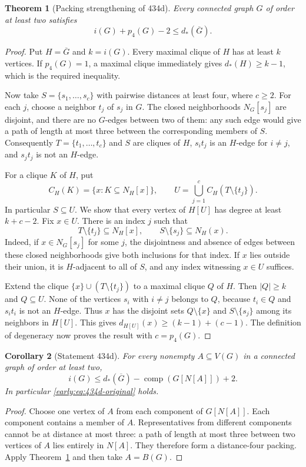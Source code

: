 \documentclass[11pt,a4paper]{article}
\newtheorem{theorem}{Theorem}[section]
\newtheorem{corollary}[theorem]{Corollary}
\theoremstyle{definition}\newtheorem{definition}[theorem]{Definition}
\theoremstyle{remark}\newtheorem{remark}[theorem]{Remark}
\begin{document}
\begin{theorem}[Packing strengthening of 434d]
\label{early:thm:434d-packing}
Every connected graph $G$ of order at least two satisfies
\[
 i(G)+p_4(G)-2\leq d_*(\overline G).
\]
\end{theorem}
\begin{proof}
Put $H=\overline G$ and $k=i(G)$.  Every maximal clique of $H$ has at
least $k$ vertices.  If $p_4(G)=1$, a maximal clique immediately gives
$d_*(H)\geq k-1$, which is the required inequality.

Now take $S=\{s_1,\ldots,s_c\}$ with pairwise distances at least four,
where $c\geq2$.  For each $j$, choose a neighbor $t_j$ of $s_j$ in $G$.
The closed neighborhoods $N_G[s_j]$ are disjoint, and there are no
$G$-edges between two of them: any such edge would give a path of length
at most three between the corresponding members of $S$.  Consequently
$T=\{t_1,\ldots,t_c\}$ and $S$ are cliques of $H$, $s_it_j$ is an
$H$-edge for $i\ne j$, and $s_jt_j$ is not an $H$-edge.

For a clique $K$ of $H$, put
\[
 C_H(K)=\{x:K\subseteq N_H[x]\},\qquad
 U=\bigcup_{j=1}^c C_H(T\setminus\{t_j\}).
\]
In particular $S\subseteq U$.  We show that every vertex of $H[U]$ has
degree at least $k+c-2$.  Fix $x\in U$.  There is an index $j$ such that
\[
 T\setminus\{t_j\}\subseteq N_H[x],\qquad
 S\setminus\{s_j\}\subseteq N_H(x).
\]
Indeed, if $x\in N_G[s_j]$ for some $j$, the disjointness and absence of
edges between these closed neighborhoods give both inclusions for that
index.  If $x$ lies outside their union, it is $H$-adjacent to all of $S$,
and any index witnessing $x\in U$ suffices.

Extend the clique $\{x\}\cup(T\setminus\{t_j\})$ to a maximal clique
$Q$ of $H$.  Then $|Q|\geq k$ and $Q\subseteq U$.  None of the vertices
$s_i$ with $i\ne j$ belongs to $Q$, because $t_i\in Q$ and $s_it_i$ is
not an $H$-edge.  Thus $x$ has the disjoint sets $Q\setminus\{x\}$ and
$S\setminus\{s_j\}$ among its neighbors in $H[U]$.  This gives
$d_{H[U]}(x)\geq(k-1)+(c-1)$.  The definition of degeneracy now proves
the result with $c=p_4(G)$.
\end{proof}

\begin{corollary}[Statement 434d]
\label{early:cor:434d}
For every nonempty $A\subseteq V(G)$ in a connected graph of order at
least two,
\[
 i(G)\leq d_*(\overline G)-
 \operatorname{comp}(G[N[A]])+2.
\]
In particular \eqref{early:eq:434d-original} holds.
\end{corollary}
\begin{proof}
Choose one vertex of $A$ from each component of $G[N[A]]$.  Each component
contains a member of $A$.  Representatives from different components
cannot be at distance at most three: a path of length at most three
between two vertices of $A$ lies entirely in $N[A]$.  They therefore
form a distance-four packing.  Apply Theorem~\ref{early:thm:434d-packing}
and then take $A=B(G)$.
\end{proof}
\end{document}
